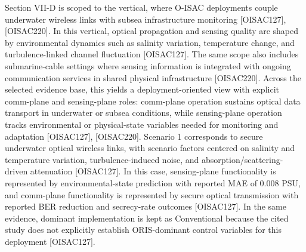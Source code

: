 \markdownRendererUlEndTight \markdownRendererInterblockSeparator
{}
\markdownRendererSectionEnd 
\markdownRendererSectionEnd \markdownRendererSectionBegin
{}\markdownRendererInterblockSeparator
{}\markdownRendererSectionBegin
{}\markdownRendererInterblockSeparator
{}Section VII-D is scoped to the  vertical, where O-ISAC deployments couple underwater wireless links with subsea infrastructure monitoring [O\markdownRendererUnderscore{}ISAC\markdownRendererUnderscore{}127], [O\markdownRendererUnderscore{}ISAC\markdownRendererUnderscore{}220]. In this vertical, optical propagation and sensing quality are shaped by environmental dynamics such as salinity variation, temperature change, and turbulence-linked channel fluctuation [O\markdownRendererUnderscore{}ISAC\markdownRendererUnderscore{}127]. The same scope also includes submarine-cable settings where sensing information is integrated with ongoing communication services in shared physical infrastructure [O\markdownRendererUnderscore{}ISAC\markdownRendererUnderscore{}220]. Across the selected evidence base, this yields a deployment-oriented view with explicit comm-plane and sensing-plane roles: comm-plane operation sustains optical data transport in underwater or subsea conditions, while sensing-plane operation tracks environmental or physical-state variables needed for monitoring and adaptation [O\markdownRendererUnderscore{}ISAC\markdownRendererUnderscore{}127], [O\markdownRendererUnderscore{}ISAC\markdownRendererUnderscore{}220].\markdownRendererInterblockSeparator
{}
\markdownRendererSectionEnd \markdownRendererSectionBegin
{}\markdownRendererInterblockSeparator
{}Scenario 1 corresponds to secure underwater optical wireless links, with scenario factors centered on salinity and temperature variation, turbulence-induced noise, and absorption/scattering-driven attenuation [O\markdownRendererUnderscore{}ISAC\markdownRendererUnderscore{}127]. In this case, sensing-plane functionality is represented by environmental-state prediction with reported MAE of 0.008 PSU, and comm-plane functionality is represented by secure optical transmission with reported BER reduction and secrecy-rate outcomes [O\markdownRendererUnderscore{}ISAC\markdownRendererUnderscore{}127]. In the same evidence, dominant implementation is kept as Conventional because the cited study does not explicitly establish ORIS-dominant control variables for this deployment [O\markdownRendererUnderscore{}ISAC\markdownRendererUnderscore{}127].\markdownRendererParagraphSeparator
